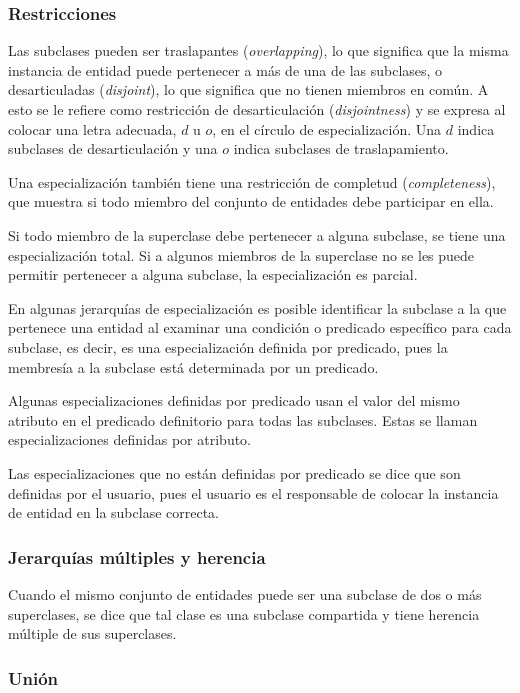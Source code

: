 \subsubsection*{Restricciones}

Las subclases pueden ser traslapantes (\textit{overlapping}), lo que significa que la misma instancia de entidad puede pertenecer a más de una de las subclases, o desarticuladas (\textit{disjoint}), lo que significa que no tienen miembros en común. A esto se le refiere como restricción de desarticulación (\textit{disjointness}) y se expresa al colocar una letra adecuada, $d$ u $o$, en el círculo de especialización. Una $d$ indica subclases de desarticulación y una $o$ indica subclases de traslapamiento. 


Una especialización también tiene una restricción de completud (\textit{completeness}), que muestra si todo miembro del conjunto de entidades debe participar en ella.


Si todo miembro de la superclase debe pertenecer a alguna subclase, se tiene una especialización total. Si a algunos miembros de la superclase no se les puede permitir pertenecer a alguna subclase, la especialización es parcial.


En algunas jerarquías de especialización es posible identificar la subclase a la que pertenece una entidad al examinar una condición o predicado específico para cada subclase, es decir, es una especialización definida por predicado, pues la membresía a la subclase está determinada por un predicado.


Algunas especializaciones definidas por predicado usan el valor del mismo atributo en el predicado definitorio para todas las subclases. Estas se llaman especializaciones definidas por atributo. 


Las especializaciones que no están definidas por predicado se dice que son definidas por el usuario, pues el usuario es el responsable de colocar la instancia de entidad en la subclase correcta.


\subsubsection*{Jerarquías múltiples y herencia}

Cuando el mismo conjunto de entidades puede ser una subclase de dos o más superclases, se dice que tal clase es una subclase compartida y tiene herencia múltiple de sus superclases.


\subsubsection*{Unión}

